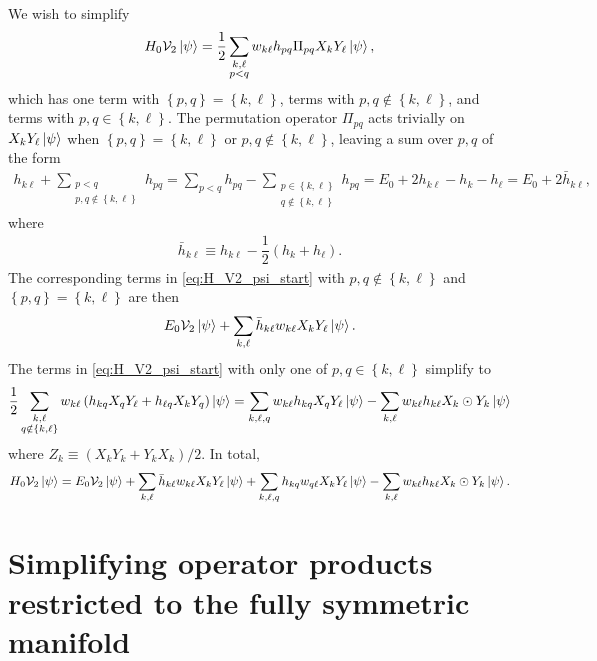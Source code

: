 \documentclass[nofootinbib,notitlepage,11pt]{revtex4-2}
\newcommand{\f}[2]{\dfrac{#1}{#2}} %
\newcommand{\p}[1]{\left(#1\right)} %
\renewcommand{\set}[1]{\left\{#1\right\}} %
\newcommand{\1}{\mathds{1}}
\newcommand{\V}{\mathcal{V}}
\begin{document}
We wish to simplify
\begin{align}
  H_0 \V_2 \ket\psi
  = \f12 \sum_{\substack{k,\ell\\p<q}} w_{k\ell} h_{pq}
  \Pi_{pq} X_k Y_\ell \ket\psi,
  \label{eq:H_V2_psi_start}
\end{align}
which has one term with $\set{p,q}=\set{k,\ell}$, terms with
$p,q\notin\set{k,\ell}$, and terms with $p,q\in\set{k,\ell}$.  The
permutation operator $\Pi_{pq}$ acts trivially on
$X_k Y_\ell \ket\psi$ when $\set{p,q}=\set{k,\ell}$ or
$p,q\notin\set{k,\ell}$, leaving a sum over $p,q$ of the form
\begin{align}
  h_{k\ell} + \sum_{\substack{p<q\\p,q\notin\set{k,\ell}}} h_{pq}
  = \sum_{p<q} h_{pq}
  - \sum_{\substack{p\in\set{k,\ell}\\q\notin\set{k,\ell}}} h_{pq}
  = E_0 + 2 h_{k\ell} - h_k - h_\ell
  = E_0 + 2 \bar h_{k\ell},
\end{align}
where
\begin{align}
  \bar h_{k\ell} \equiv h_{k\ell} - \f12\p{h_k + h_\ell}.
\end{align}
The corresponding terms in \eqref{eq:H_V2_psi_start} with
$p,q\notin\set{k,\ell}$ and $\set{p,q}=\set{k,\ell}$ are then
\begin{align}
  E_0 \V_2 \ket\psi
  + \sum_{k,\ell} \bar h_{k\ell} w_{k\ell} X_k Y_\ell \ket\psi.
\end{align}
The terms in \eqref{eq:H_V2_psi_start} with only one of
$p,q\in\set{k,\ell}$ simplify to
\begin{align}
  \f12 \sum_{\substack{k,\ell\\q\notin\set{k,\ell}}} w_{k\ell}
  \p{h_{kq} X_q Y_\ell + h_{\ell q} X_k Y_q} \ket\psi
  = \sum_{k,\ell,q} w_{k\ell} h_{kq} X_q Y_\ell \ket\psi
  - \sum_{k,\ell} w_{k\ell} h_{k\ell} X_k\odot Y_k \ket\psi
\end{align}
where $Z_k\equiv\p{X_kY_k+Y_kX_k}/2$.  In total,
\begin{align}
  H_0 \V_2 \ket\psi
  = E_0 \V_2 \ket\psi
  + \sum_{k,\ell} \bar h_{k\ell} w_{k\ell} X_k Y_\ell \ket\psi
  + \sum_{k,\ell,q} h_{kq} w_{q\ell} X_k Y_\ell \ket\psi
  - \sum_{k,\ell} w_{k\ell} h_{k\ell} X_k\odot Y_k \ket\psi.
\end{align}

\section{Simplifying operator products restricted to the fully
  symmetric manifold}
\label{sec:sym_prod}
\end{document}
